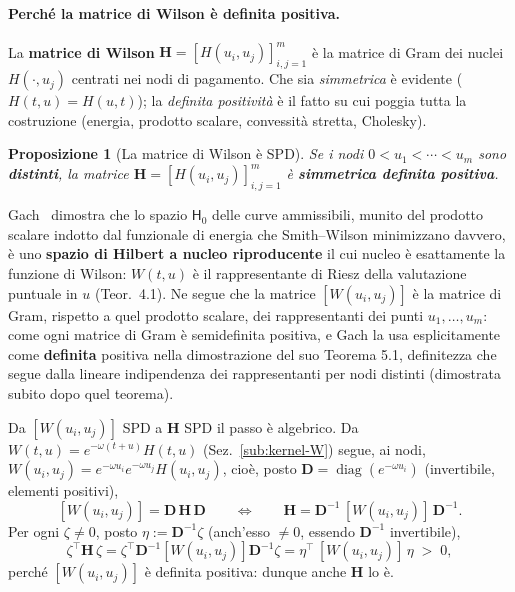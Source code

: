 \documentclass[11pt,a4paper]{article}
\theoremstyle{plain}
\newtheorem{proposizione}[teorema]{Proposizione}
\theoremstyle{definition}
\theoremstyle{remark}
\newcommand{\Hmat}{\mathbf{H}}
\newcommand{\transp}{^{\!\top}}
\begin{document}
\paragraph{Perch\'e la matrice di Wilson \`e definita positiva.}
La \textbf{matrice di Wilson} $\Hmat = [H(u_i,u_j)]_{i,j=1}^{m}$ \`e la matrice di Gram dei
nuclei $H(\cdot,u_j)$ centrati nei nodi di pagamento. Che sia \emph{simmetrica} \`e evidente
($H(t,u)=H(u,t)$); la \emph{definita positivit\`a} \`e il fatto su cui poggia tutta la
costruzione (energia, prodotto scalare, convessit\`a stretta, Cholesky).

\begin{proposizione}[La matrice di Wilson \`e SPD]
\label{prop:H-spd}
Se i nodi $0<u_1<\cdots<u_m$ sono \textbf{distinti}, la matrice
$\Hmat=[H(u_i,u_j)]_{i,j=1}^m$ \`e \textbf{simmetrica definita positiva}.
\end{proposizione}

Gach~\cite{gach2017} dimostra che lo spazio $\mathsf{H}_0$ delle curve ammissibili, munito del
prodotto scalare indotto dal funzionale di energia che Smith--Wilson minimizzano davvero, \`e
uno \textbf{spazio di Hilbert a nucleo riproducente} il cui nucleo \`e esattamente la funzione
di Wilson: $W(t,u)$ \`e il rappresentante di Riesz della valutazione puntuale in $u$ (Teor.~4.1).
Ne segue che la matrice $[W(u_i,u_j)]$ \`e la matrice di Gram, rispetto a quel prodotto
scalare, dei rappresentanti dei punti $u_1,\ldots,u_m$: come ogni matrice di Gram \`e
semidefinita positiva, e Gach la usa esplicitamente come \textbf{definita} positiva nella
dimostrazione del suo Teorema 5.1, definitezza che segue dalla lineare indipendenza dei
rappresentanti per nodi distinti (dimostrata subito dopo quel teorema).

Da $[W(u_i,u_j)]$ SPD a $\Hmat$ SPD il passo \`e algebrico. Da $W(t,u)=e^{-\omega(t+u)}H(t,u)$
(Sez.~\ref{sub:kernel-W}) segue, ai nodi, $W(u_i,u_j)=e^{-\omega u_i}e^{-\omega u_j}H(u_i,u_j)$,
cio\`e, posto $\mathbf{D}=\operatorname{diag}(e^{-\omega u_i})$ (invertibile, elementi
positivi),
\[
  [W(u_i,u_j)] = \mathbf{D}\,\Hmat\,\mathbf{D}
  \qquad\Longleftrightarrow\qquad
  \Hmat = \mathbf{D}^{-1}\,[W(u_i,u_j)]\,\mathbf{D}^{-1} .
\]
Per ogni $\zeta\neq 0$, posto $\eta:=\mathbf{D}^{-1}\zeta$ (anch'esso $\neq 0$, essendo
$\mathbf{D}^{-1}$ invertibile),
\[
  \zeta\transp\Hmat\,\zeta = \zeta\transp\mathbf{D}^{-1}[W(u_i,u_j)]\mathbf{D}^{-1}\zeta
  = \eta\transp\,[W(u_i,u_j)]\,\eta \;>\; 0 ,
\]
perch\'e $[W(u_i,u_j)]$ \`e definita positiva: dunque anche $\Hmat$ lo \`e.
\end{document}

